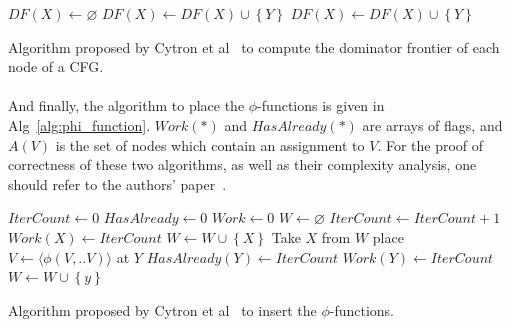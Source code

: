 \begin{algorithm}
	\begin{algorithmic}[1]
			\State $DF(X) \leftarrow \varnothing$
					\State $DF(X) \leftarrow DF(X) \cup \left\{Y\right\}$
				\EndIf
			\EndFor
						\State $DF(X) \leftarrow DF(X) \cup \left\{Y\right\}$
					\EndIf
				\EndFor
			\EndFor
		\EndFor
	\end{algorithmic}
	\caption{Algorithm proposed by Cytron et al~\cite{cytron1991efficiently} to compute the dominator frontier of each node of a CFG.}
	\label{alg:dom_front}
\end{algorithm}

\paragraph{}
And finally, the algorithm to place the $\phi$-functions is given in Alg~\ref{alg:phi_function}. $Work(*)$ and $HasAlready(*)$ are arrays of flags, and $A(V)$ is the set of nodes which contain an assignment to $V$. For the proof of correctness of these two algorithms, as well as their complexity analysis, one should refer to the authors' paper~\cite{cytron1991efficiently}.

\begin{algorithm}
	\begin{algorithmic}[1]
		\State $IterCount \leftarrow 0$
			\State $HasAlready \leftarrow 0$
			\State $Work \leftarrow 0$
		\EndFor
		\State $W \leftarrow \varnothing$
			\State $IterCount \leftarrow IterCount + 1$
				\State $Work(X) \leftarrow IterCount$
				\State $W \leftarrow W  \cup \left\{X\right\}$
			\EndFor
				\State Take $X$ from $W$
						\State place $V \leftarrow \langle\phi(V, ..V)\rangle$ at $Y$
						\State $HasAlready(Y) \leftarrow IterCount$
							\State $Work(Y) \leftarrow IterCount$
							\State $W \leftarrow W \cup \left\{y\right\}$
						\EndIf
					\EndIf
				\EndFor
			\EndWhile
		\EndFor
	\end{algorithmic}
	\caption{Algorithm proposed by Cytron et al~\cite{cytron1991efficiently} to insert the $\phi$-functions.}
	\label{alg:phi_function}
\end{algorithm}


